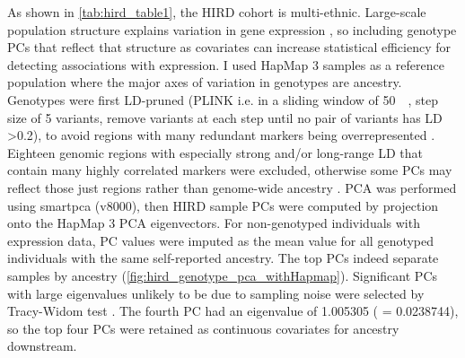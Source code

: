As shown in \cref{tab:hird_table1}, the \gls{HIRD} cohort is multi-ethnic.
Large-scale population structure explains variation in gene expression \autocite{stegle2012UsingProbabilisticEstimation,brown2018ExpressionReflectsPopulation}, 
so including genotype \glspl{PC} that reflect that structure as covariates can increase statistical efficiency for detecting associations with expression.
I used HapMap 3 samples \autocite{theinternationalhapmap3consortium2010IntegratingCommonRare} as a reference population where the major axes of variation in genotypes are ancestry.
Genotypes were first \gls{LD}-pruned (PLINK  i.e. in a sliding window of \SI{50}{\kilo\bp}, step size of 5 variants, remove variants at each step until no pair of variants has \gls{LD} \num{>0.2}), 
to avoid regions with many redundant markers being overrepresented \autocite{price2006PrincipalComponentsAnalysis,abdellaoui2013PopulationStructureMigration}.
Eighteen genomic regions with especially strong and/or long-range \gls{LD} that contain many highly correlated markers were excluded, otherwise some \glspl{PC} may reflect those just regions rather than genome-wide ancestry \autocite{price2006PrincipalComponentsAnalysis,prive2020EfficientToolkitImplementing}.
\gls{PCA} was performed using smartpca (v8000),
then \gls{HIRD} sample \glspl{PC} were computed by projection onto the HapMap 3 \gls{PCA} eigenvectors.
%
For non-genotyped individuals with expression data, 
\gls{PC} values were imputed as the mean value for all genotyped individuals with the same self-reported ancestry.
The top \glspl{PC} indeed separate samples by ancestry (\cref{fig:hird_genotype_pca_withHapmap}).
Significant \glspl{PC} with large eigenvalues unlikely to be due to sampling noise were selected by Tracy-Widom test \autocite{patterson2006PopulationStructureEigenanalysis}.
The fourth \gls{PC} had an eigenvalue of \num{1.005305} (\pvalue{} = \num{0.0238744}), 
so the top four \glspl{PC} were retained as continuous covariates for ancestry downstream.

